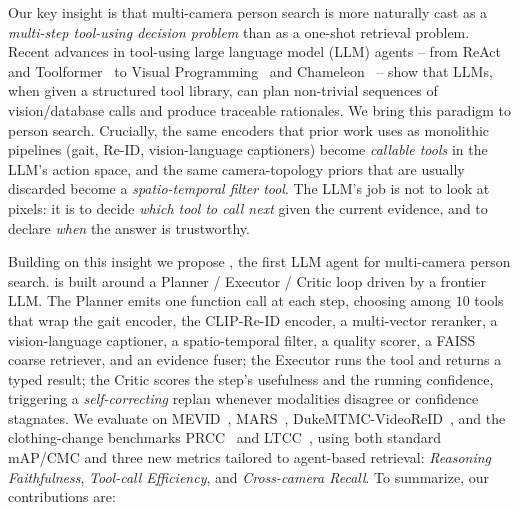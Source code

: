 Our key insight is that multi-camera person search is more naturally cast
as a \emph{multi-step tool-using decision problem} than as a one-shot
retrieval problem. Recent advances in tool-using large language model
(LLM) agents -- from ReAct~\cite{yao2023react} and
Toolformer~\cite{schick2023toolformer} to Visual
Programming~\cite{gupta2023visprog} and Chameleon~\cite{lu2023chameleon}
-- show that LLMs, when given a structured tool library, can plan
non-trivial sequences of vision/database calls and produce traceable
rationales. We bring this paradigm to person search. Crucially, the same
encoders that prior work uses as monolithic pipelines (gait, Re-ID,
vision-language captioners) become \emph{callable tools} in the LLM's
action space, and the same camera-topology priors that are usually
discarded become a \emph{spatio-temporal filter tool}. The LLM's job is
not to look at pixels: it is to decide \emph{which tool to call next}
given the current evidence, and to declare \emph{when} the answer is
trustworthy.

Building on this insight we propose \method, the first LLM agent for
multi-camera person search. \method{} is built around a Planner /
Executor / Critic loop driven by a frontier LLM. The Planner emits one
function call at each step, choosing among $10$ tools that wrap the gait
encoder, the CLIP-Re-ID encoder, a multi-vector reranker, a vision-language
captioner, a spatio-temporal filter, a quality scorer, a FAISS coarse
retriever, and an evidence fuser; the Executor runs the tool and returns a
typed result; the Critic scores the step's usefulness and the running
confidence, triggering a \emph{self-correcting} replan whenever
modalities disagree or confidence stagnates. We evaluate
\method{} on MEVID~\cite{davila2023mevid}, MARS~\cite{zheng2016mars},
DukeMTMC-VideoReID~\cite{wu2018duke}, and the clothing-change benchmarks
PRCC~\cite{yang2019prcc} and LTCC~\cite{qian2020ltcc}, using both standard
mAP/CMC and three new metrics tailored to agent-based retrieval:
\emph{Reasoning Faithfulness}, \emph{Tool-call Efficiency}, and
\emph{Cross-camera Recall}. To summarize, our contributions are:


